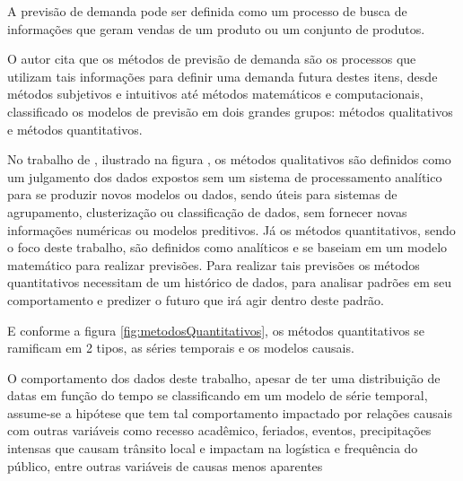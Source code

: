 A previsão de demanda pode ser definida como um processo de busca de informações que geram vendas de um produto ou um conjunto de produtos.

O autor  cita que os métodos de previsão de demanda são os processos que utilizam tais informações para definir uma demanda futura destes itens, desde métodos subjetivos e intuitivos até métodos matemáticos e computacionais, classificado os modelos de previsão em dois grandes grupos: métodos qualitativos e métodos quantitativos.

No trabalho de , ilustrado na figura \label{fig:metodosPrevisaoDemanda}, os métodos qualitativos são definidos como um julgamento dos dados expostos sem um sistema de processamento analítico para se produzir novos modelos ou dados, sendo úteis para sistemas de agrupamento, clusterização ou classificação de dados, sem fornecer novas informações numéricas ou modelos preditivos. Já os métodos quantitativos, sendo o foco deste trabalho, são definidos como analíticos e se baseiam em um modelo matemático para realizar previsões. Para realizar tais previsões os métodos quantitativos necessitam de um histórico de dados, para analisar padrões em seu comportamento e predizer o futuro que irá agir dentro deste padrão.

          \begin{figure}[H]
          \end{figure}

E conforme a figura \ref{fig:metodosQuantitativos}, os métodos quantitativos se ramificam em 2 tipos, as séries temporais e os modelos causais.

          \begin{figure}[H]
          \end{figure}

O comportamento dos dados deste trabalho, apesar de ter uma distribuição de datas em função do tempo se classificando em um modelo de série temporal, assume-se a hipótese que tem tal comportamento impactado por relações causais com outras variáveis como recesso acadêmico, feriados, eventos, precipitações intensas que causam trânsito local e impactam na logística e frequência do público, entre outras variáveis de causas menos aparentes

